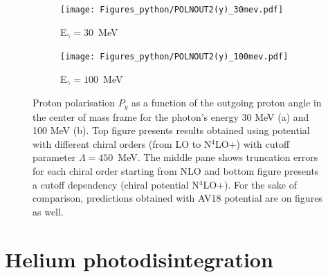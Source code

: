     
    \begin{figure}[h]
        \centering
        \begin{subfigure}[b]{0.46\textwidth}
            \texttt{[image: Figures\_python/POLNOUT2(y)\_30mev.pdf]}
            \caption{\small E$_\gamma = 30$~MeV}
            \label{PY_30_vert}
        \end{subfigure}
        \begin{subfigure}[b]{0.46\textwidth}
            \texttt{[image: Figures\_python/POLNOUT2(y)\_100mev.pdf]}
            \caption{\small E$_\gamma = 100$~MeV}
            \label{PY_100_vert}
        \end{subfigure}
        \caption{Proton polarisation $P_y$ 
        as a function of the outgoing proton angle in the center of mass frame 
        for the photon's energy 30 MeV (a) and 100 MeV (b).
        Top figure presents results obtained using potential
        with different chiral orders (from LO to N$^4$LO+) with cutoff parameter $\Lambda=450$~MeV.
        The middle pane shows truncation errors for each 
        chiral order starting from NLO and
        bottom figure presents a cutoff dependency (chiral potential N$^4$LO+).
        For the sake of comparison, predictions obtained with AV18 potential are on  figures as well.}
    \end{figure}

\clearpage

\section{Helium photodisintegration}

